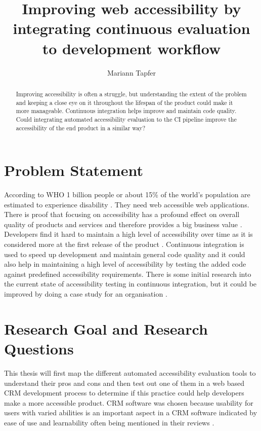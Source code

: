 \documentclass{thesis_proposal}
\title{Improving web accessibility by integrating continuous evaluation to development workflow}
\author{Mariann Tapfer}
\begin{document}
\maketitle

\begin{abstract}
    Improving accessibility is often a struggle, but understanding the extent of the problem and keeping a close eye on it throughout the lifespan of the product could make it more manageable. Continuous integration helps improve and maintain code quality. Could integrating automated accessibility evaluation to the CI pipeline improve the accessibility of the end product in a similar way?
\end{abstract}

\section{Problem Statement}
According to WHO 1 billion people or about 15\% of the world's population are estimated to experience disability \citep{WHO_disability_2021}. They need web accessible web applications. There is proof that focusing on accessibility has a profound effect on overall quality of products and services and therefore provides a big business value \citep{miesenberger_user_2020}.
Developers find it hard to maintain a high level of accessibility over time as it is considered more at the first release of the product \citep{paterno_requirements_2020}. Continuous integration is used to speed up development and maintain general code quality \citep{zhao_impact_2017} and it could also help in maintaining a high level of accessibility by testing the added code against predefined accessibility requirements. There is some initial research into the current state of accessibility testing in continuous integration, but it could be improved by doing a case study for an organisation \citep{sane_brief_2021}.


\section{Research Goal and Research Questions}
This thesis will first map the different automated accessibility evaluation tools to understand their pros and cons and then test out one of them in a web based CRM development process to determine if this practice could help developers make a more accessible product. CRM software was chosen because usability for users with varied abilities is an important aspect in a CRM software indicated by ease of use and learnability often being mentioned in their reviews \citep{sevilla_best_2022, 23_best_CRM}.
\end{document}
